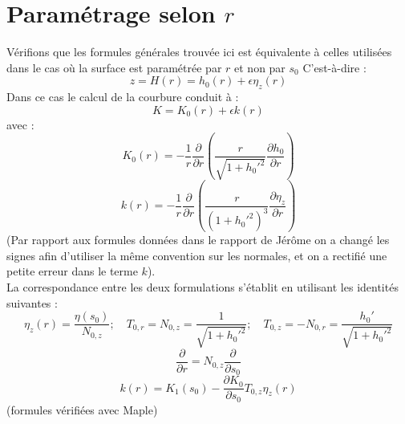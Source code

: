 \documentclass[a4paper]{report}
\newcommand\DP[2]{\frac{\partial #1}{\partial #2}}
\begin{document}
\section{Paramétrage selon $r$}
Vérifions que les formules générales trouvée ici est équivalente à celles utilisées dans le cas où la surface est paramétrée par $r$ et non par $s_0$ C'est-à-dire :
$$
z = H(r) = h_0(r) + \epsilon \eta_z (r)
$$
Dans ce cas le calcul de la courbure conduit à :
$$
K =  K_0(r) + \epsilon k(r)
$$
avec :
$$
K_0(r) = -\frac{1}{r} \DP{}{r} \left( \frac{r}{\sqrt{1+ h_0'^2}} \DP{h_0}{r} \right)
$$
$$
k(r) = -\frac{1}{r} \DP{}{r} \left( \frac{r}{\left(1+ h_0'^2\right)^3} \DP{\eta_z}{r} \right) 
$$
(Par rapport aux formules données dans le rapport de Jérôme on a changé les signes afin d'utiliser la même convention sur les normales, et on a rectifié une petite erreur dans le terme $k$).
\\
La correspondance entre les deux formulations s'établit en utilisant les identités suivantes :
$$ 
\eta_z(r) = \frac{\eta(s_0)}{N_{0,z}}  ; 
\quad 
T_{0,r} = N_{0,z} = \frac{1}{\sqrt{1+ h_0'^2}}; 
\quad 
T_{0,z} = -N_{0,r} =  \frac{h_0'}{\sqrt{1+ h_0'^2}}
$$
$$
\DP{}{r} = N_{0,z} \DP{}{s_0}
$$
$$
k(r) = K_1(s_0)  - \DP{K_0}{s_0} T_{0,z} \eta_z(r)
$$
(formules vérifiées avec Maple)
\end{document}
